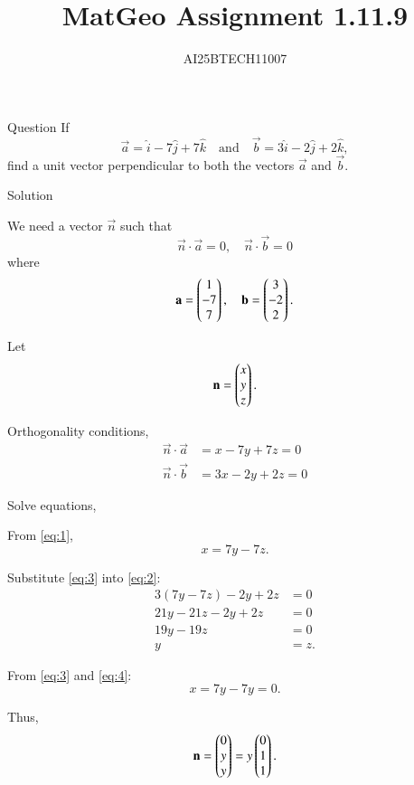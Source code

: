 \documentclass{beamer}
\title 
{MatGeo Assignment 1.11.9}
\author
{AI25BTECH11007}
\begin{document}
\frame{\titlepage}
\begin{frame}{Question}
If
\[
\vec{a} = \hat{i} - 7\hat{j} + 7\hat{k}
\quad \text{and} \quad
\vec{b} = 3\hat{i} - 2\hat{j} + 2\hat{k},
\]
find a unit vector perpendicular to both the vectors $\vec{a}$ and $\vec{b}$.\\
\end{frame}
\begin{frame}{Solution}

We need a vector $\vec{n}$ such that
\begin{equation}
\vec{n} \cdot \vec{a} = 0, \quad \vec{n} \cdot \vec{b} = 0
\end{equation}
where
\begin{equation}
\mathbf{a} = \begin{pmatrix}1 \\ -7 \\ 7\end{pmatrix}, \quad 
\mathbf{b} = \begin{pmatrix}3 \\ -2 \\ 2\end{pmatrix}.
\end{equation}

Let
\begin{equation}
\mathbf{n} = \begin{pmatrix}x \\ y \\ z\end{pmatrix}.
\end{equation}

Orthogonality conditions,
\begin{align}
\vec{n} \cdot \vec{a} &= x - 7y + 7z = 0 \label{eq:1} \\
\vec{n} \cdot \vec{b} &= 3x - 2y + 2z = 0 \label{eq:2}
\end{align}
\end{frame}
\begin{frame}
    

Solve equations,

From \eqref{eq:1},
\begin{equation}
x = 7y - 7z. \label{eq:3}
\end{equation}

Substitute \eqref{eq:3} into \eqref{eq:2}:
\begin{align}
3(7y - 7z) - 2y + 2z &= 0 \\
21y - 21z - 2y + 2z &= 0 \\
19y - 19z &= 0 \\
y &= z. \label{eq:4}
\end{align}

From \eqref{eq:3} and \eqref{eq:4}:
\begin{equation}
x = 7y - 7y = 0.
\end{equation}

Thus,
\begin{equation}
\mathbf{n} = \begin{pmatrix}0 \\ y \\ y\end{pmatrix} = y \begin{pmatrix}0 \\ 1 \\ 1\end{pmatrix}.
\end{equation}
\end{frame}
\end{document}
